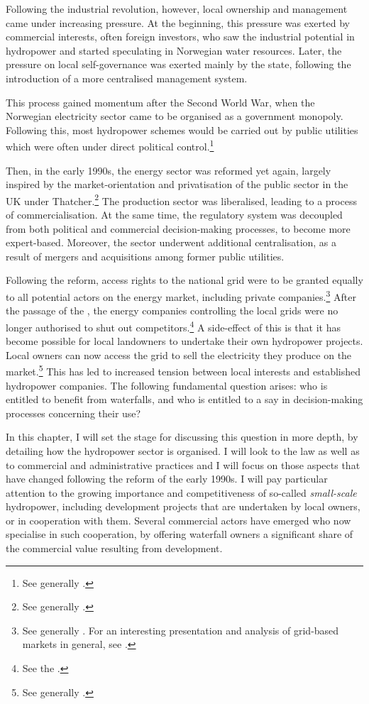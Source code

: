 Following the industrial revolution, however, local ownership and management came under increasing pressure. At the beginning, this pressure was exerted by commercial interests, often foreign investors, who saw the industrial potential in hydropower and started speculating in Norwegian water resources. Later, the pressure on local self-governance was exerted mainly by the state, following the introduction of a more centralised management system.

This process gained momentum after the Second World War, when the Norwegian electricity sector came to be organised as a government monopoly. Following this, most hydropower schemes would be carried out by public utilities which were often under direct political control.\footnote{See generally \cite{skjold06}.}

Then, in the early 1990s, the energy sector was reformed yet again, largely inspired by the market-orientation and privatisation of the public sector in the UK under Thatcher.\footnote{See generally \cite{midttun98}.} The production sector was liberalised, leading to a process of commercialisation. At the same time, the regulatory system was decoupled from both political and commercial decision-making processes, to become more expert-based. Moreover, the sector underwent  additional centralisation, as a result of mergers and acquisitions among former public utilities.

Following the reform, access rights to the national grid were to be granted equally to all potential actors on the energy market, including private companies.\footnote{See generally \cite{hammer96}. For an interesting presentation and analysis of grid-based markets in general, see \cite{falch04}.} After the passage of the \cite{ea90}, the energy companies controlling the local grids were no longer authorised to shut out competitors.\footnote{See the \cite[3-4]{ea90}.} A side-effect of this is that it has become possible for local landowners to undertake their own hydropower projects. Local owners can now access the grid to sell the electricity they produce on the market.\footnote{See generally \cite{larsen06,larsen08,larsen12}.} This has led to increased tension between local interests and established hydropower companies. The following fundamental question arises: who is entitled to benefit from waterfalls, and who is entitled to a say in decision-making processes concerning their use?

In this chapter, I will set the stage for discussing this question in more depth, by detailing how the hydropower sector is organised. I will look to the law as well as to commercial and administrative practices and I will focus on those aspects that have changed following the reform of the early 1990s. I will pay particular attention to the growing importance and competitiveness of so-called {\it small-scale} hydropower, including development projects that are undertaken by local owners, or in cooperation with them. Several commercial actors have emerged who now specialise in such cooperation, by offering waterfall owners a significant share of the commercial value resulting from development. 

